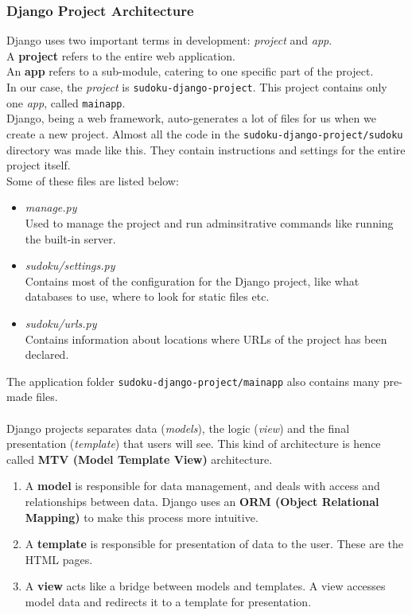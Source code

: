 \documentclass[12pt, a4paper]{report}
\begin{document}
    \subsubsection{Django Project Architecture}
    Django uses two important terms in development: \emph{project} and \emph{app}.\\
    A \textbf{project} refers to the entire web application.\\
    An \textbf{app} refers to a sub-module, catering to one specific part of the project.\\
    In our case, the \emph{project} is \texttt{sudoku-django-project}. This project contains only one \emph{app}, called \texttt{mainapp}.\\
    Django, being a web framework, auto-generates a lot of files for us when we create a new project. Almost all the code in the \texttt{sudoku-django-project/sudoku} directory was made like this. They contain instructions and settings for the entire project itself.\\
    Some of these files are listed below:
    \begin{itemize}
        \item \textit{manage.py}\\
        Used to manage the project and run adminsitrative commands like running the built-in server.
        \item \textit{sudoku/settings.py}\\
        Contains most of the configuration for the Django project, like what databases to use, where to look for static files etc.
        \item \textit{sudoku/urls.py}\\
        Contains information about locations where URLs of the project has been declared.
    \end{itemize}
    The application folder \texttt{sudoku-django-project/mainapp} also contains many pre-made files.\\
    \\
    Django projects separates data (\emph{models}), the logic (\emph{view}) and the final presentation (\emph{template}) that users will see. This kind of architecture is hence called \textbf{MTV (Model Template View)} architecture.\\
    \begin{enumerate}
        \item A \textbf{model} is responsible for data management, and deals with access and relationships between data. Django uses an \textbf{ORM (Object Relational Mapping)} to make this process more intuitive.
        \item A \textbf{template} is responsible for presentation of data to the user. These are the HTML pages.
        \item A \textbf{view} acts like a bridge between models and templates. A view accesses model data and redirects it to a template for presentation.
    \end{enumerate}
\end{document}

